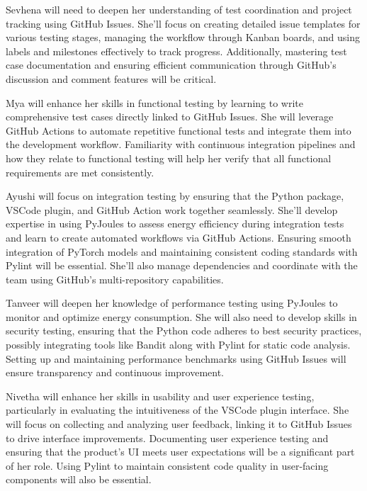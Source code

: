 \documentclass[12pt, titlepage]{article}
\begin{document}
\begin{appendices}
\begin{itemize}
  Sevhena will need to deepen her understanding of test coordination and project 
  tracking using GitHub Issues. She’ll focus on creating detailed issue templates 
  for various testing stages, managing the workflow through Kanban boards, and using 
  labels and milestones effectively to track progress. Additionally, mastering test 
  case documentation and ensuring efficient communication through GitHub’s discussion 
  and comment features will be critical.

  Mya will enhance her skills in functional testing by learning to write comprehensive 
  test cases directly linked to GitHub Issues. She will leverage GitHub Actions to 
  automate repetitive functional tests and integrate them into the development workflow. 
  Familiarity with continuous integration pipelines and how they relate to functional 
  testing will help her verify that all functional requirements are met consistently.

  Ayushi will focus on integration testing by ensuring that the Python package, VSCode 
  plugin, and GitHub Action work together seamlessly. She’ll develop expertise in using 
  PyJoules to assess energy efficiency during integration tests and learn to create 
  automated workflows via GitHub Actions. Ensuring smooth integration of PyTorch models 
  and maintaining consistent coding standards with Pylint will be essential. She’ll 
  also manage dependencies and coordinate with the team using GitHub’s multi-repository 
  capabilities.

  Tanveer will deepen her knowledge of performance testing using PyJoules to monitor 
  and optimize energy consumption. She will also need to develop skills in security 
  testing, ensuring that the Python code adheres to best security practices, possibly 
  integrating tools like Bandit along with Pylint for static code analysis. Setting 
  up and maintaining performance benchmarks using GitHub Issues will ensure transparency 
  and continuous improvement.

  Nivetha will enhance her skills in usability and user experience testing, particularly 
  in evaluating the intuitiveness of the VSCode plugin interface. She will focus on 
  collecting and analyzing user feedback, linking it to GitHub Issues to drive interface 
  improvements. Documenting user experience testing and ensuring that the product’s UI 
  meets user expectations will be a significant part of her role. Using Pylint to maintain 
  consistent code quality in user-facing components will also be essential.


\end{itemize}
\end{appendices}
\end{document}
